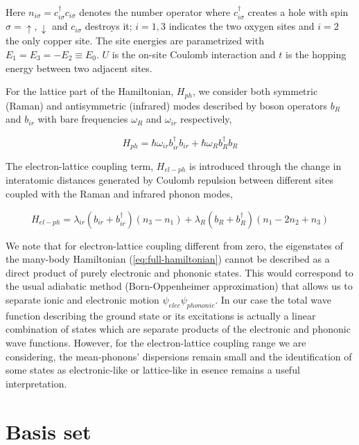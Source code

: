 Here $n_{i\sigma}=c_{i\sigma}^\dagger c_{i\sigma}$ denotes the number operator where $c_{i\sigma}^\dagger$ creates a hole with spin $\sigma = \uparrow, \downarrow$ and $c_{i\sigma}$ destroys it; $i=1,3$ indicates the two oxygen sites and $i=2$ the only copper site. 
The site energies are parametrized with $E_1=E_3=-E_2 \equiv E_0$. $U$ is the on-site Coulomb interaction and $t$ is the hopping energy between two adjacent sites.

For the lattice  part of the Hamiltonian, $H_{ph}$, we consider both symmetric (Raman) and antisymmetric (infrared) modes described by boson operators $b_R$ and $b_{ir}$ with bare frequencies $\omega_R$ and $\omega_{ir}$ respectively,
 
\begin{equation}\label{eq:phonon-part}
H_{ph} = \hbar \omega_{ir}b_{ir}^\dagger b_{ir} + \hbar \omega_R b_R^\dagger b_R
\end{equation}
 
The electron-lattice coupling term, $H_{el-ph}$ is introduced through the change in interatomic distances generated by Coulomb repulsion between different sites coupled with the Raman and infrared phonon modes,
 
\begin{equation}\label{eq:coupling-part}
H_{el-ph} = \lambda_{ir}(b_{ir} + b_{ir}^\dagger)(n_3 - n_1) + \lambda_R (b_R + b_R^\dagger)(n_1 - 2n_2 + n_3)
\end{equation}


We note that for electron-lattice coupling different from zero, the eigenstates of the many-body Hamiltonian (\ref{eq:full-hamiltonian}) cannot be described as a direct product of purely electronic and phononic states. 
This would correspond to the usual adiabatic method (Born-Oppenheimer approximation) that allows us to separate ionic and electronic motion $\psi_{elec}\psi_{phononic}$. 
In our case the total wave function describing the ground state or its excitations is actually a linear combination of states which are separate products of the electronic and phononic wave functions. 
However, for the electron-lattice coupling range we are considering, the mean-phonons' dispersions remain small and the identification of some states as electronic-like or lattice-like in esence remains a useful interpretation.

\section{Basis set}

